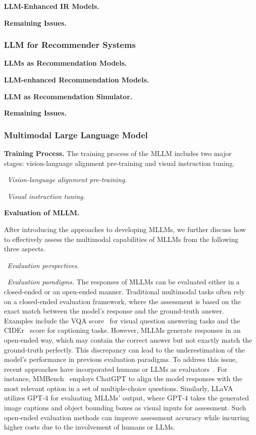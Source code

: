 \textbf{LLM-Enhanced IR Models.}

\textbf{Remaining Issues.} 

\subsubsection{LLM for Recommender Systems} 

\textbf{LLMs as Recommendation Models.}

\textbf{LLM-enhanced  Recommendation Models.}

\textbf{LLM as Recommendation Simulator.} 

\textbf{Remaining Issues.} 

\subsubsection{Multimodal Large Language Model}\label{sec-MLLM}

\textbf{Training Process.} {The training process of the MLLM includes two major stages: vision-language alignment pre-training and visual instruction tuning.} 

\textbullet~\emph{Vision-language alignment pre-training.}

\textbullet~\emph{Visual instruction tuning.}  

\textbf{Evaluation of MLLM.} {After introducing the approaches to developing MLLMs, we further discuss how to effectively assess the multimodal capabilities of MLLMs from the following three aspects.  

}

\textbullet~\emph{Evaluation perspectives.} 

\textbullet~\emph{Evaluation paradigms.}{ The responses of MLLMs can be evaluated either in a closed-ended or an open-ended manner. Traditional multimodal tasks often rely on a closed-ended evaluation framework, where the assessment is based on the exact match between the model's response and the ground-truth answer. Examples include the VQA score~\cite{Antol-iccv-2015-vqa} for visual question answering tasks and the CIDEr~\cite{Vedantam-cvpr-2015-cider} score for captioning tasks. However, MLLMs generate responses in an open-ended way, which may contain the correct answer but not exactly match the ground-truth perfectly. This discrepancy can lead to the underestimation of the model's performance in previous evaluation paradigms. To address this issue, recent approaches have incorporated humans or LLMs as evaluators~\cite {Ye-arxiv-2023-mplug}. For instance, MMBench~\cite{Liu-arxiv-2023-mmbench} employs ChatGPT to align the model responses with the most relevant option in a set of multiple-choice questions. Similarly, LLaVA~\cite{Liu-2023-arxiv-Visual} utilizes GPT-4 for evaluating MLLMs' output, where GPT-4 takes the generated image captions and object bounding boxes as visual inputs for assessment. Such open-ended evaluation methods can improve assessment accuracy while incurring higher costs due to the involvement of humans or LLMs.}

